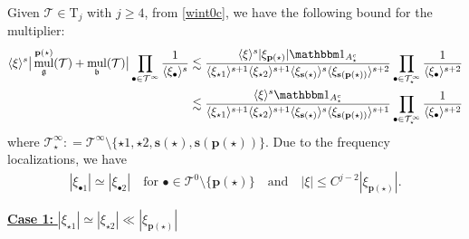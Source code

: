 \documentclass[%
11pt,  reqno]{amsart}
\newcommand{\5}{\textup{V}}
\newcommand{\noi}{\noindent}
\newcommand{\ind}{\mathbbm 1}
\newcommand{\les}{\lesssim}
\theoremstyle{remark}
\newcommand{\bul}{\bullet}
\newcommand{\TT}{\mathcal{T}}
\newcommand{\Tr}{\mathrm{T}}
\newcommand{\bfrak}{\mathfrak{b}}
\newcommand{\gfrak}{\mathfrak{g}}
\newcommand{\pb}{\mathbf{p}}
\newcommand{\sbf}{\mathbf{s}}
\newcommand{\jb}[1]
{\langle #1 \rangle}
\DeclareMathOperator{\mul}{mul}
\numberwithin{equation}{section}
\numberwithin{theorem}{section}
\begin{document}
Given $\TT \in \Tr_j$ with $j\ge4$, from \eqref{wint0c}, we have the following bound for the multiplier:
\begin{align}
    \jb{\xi}^s \big| \mul_\gfrak^{\pb(\star)} (\TT) + \mul_\bfrak(\TT) \big| 
    \prod_{\bul \in \TT^\infty} \frac{1}{\jb{\xi_\bul}^s}
    &
    \les 
    \frac{\jb{\xi}^{s} |\xi_{\pb(\star)}|  \ind_{A_\star^c} }{ \jb{\xi_{\star1}}^{s+1} \jb{\xi_{\star2}}^{s+1} \jb{\xi_{\sbf(\star)}}^s \jb{\xi_{\sbf(\pb(\star))}}^{s+2}} \prod_{\bul \in \TT^\infty_\star} \frac{1}{\jb{\xi_\bul}^{s+2}}
    \\
    &
    \les 
    \frac{\jb{\xi}^{s} \ind_{A_\star^c} }{ \jb{\xi_{\star1}}^{s+1} \jb{\xi_{\star2}}^{s+1} \jb{\xi_{\sbf(\star)}}^s \jb{\xi_{\sbf(\pb(\star))}}^{s+1}} \prod_{\bul \in \TT^\infty_\star} \frac{1}{\jb{\xi_\bul}^{s+2}}
\end{align}
where $\TT^\infty_\star : = \TT^\infty \setminus \{\star1, \star2, \sbf(\star), \sbf(\pb(\star))\}$. 
Due to the frequency localizations, we have
\begin{align}
    |\xi_{\bul1}| \simeq |\xi_{\bul2}| \quad \text{for } \bul \in \TT^0\setminus\{\pb(\star)\} 
    \quad 
    \text{and}
    \quad 
    |\xi| \le C^{j-2} |\xi_{\pb(\star)}| .  
\end{align}



\smallskip
\noi
\underline{\textbf{Case 1:} $|\xi_{\star1}| \simeq |\xi_{\star2}| \ll |\xi_{\pb(\star)}|$}
\end{document}
